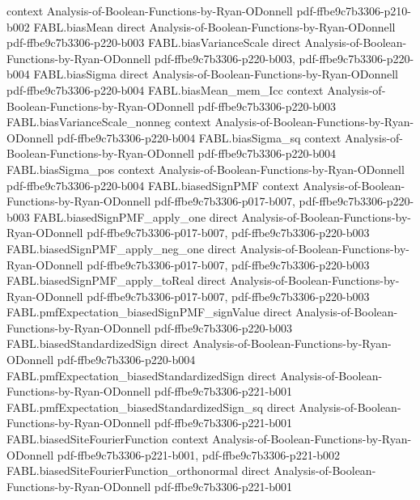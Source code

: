 \begin{theorem}
  {context}
  {Analysis-of-Boolean-Functions-by-Ryan-ODonnell}
  {pdf-ffbe9c7b3306-p210-b002}
\proofstep
  {FABL.biasMean}
  {direct}
  {Analysis-of-Boolean-Functions-by-Ryan-ODonnell}
  {pdf-ffbe9c7b3306-p220-b003}
\proofstep
  {FABL.biasVarianceScale}
  {direct}
  {Analysis-of-Boolean-Functions-by-Ryan-ODonnell}
  {pdf-ffbe9c7b3306-p220-b003,
    pdf-ffbe9c7b3306-p220-b004}
\proofstep
  {FABL.biasSigma}
  {direct}
  {Analysis-of-Boolean-Functions-by-Ryan-ODonnell}
  {pdf-ffbe9c7b3306-p220-b004}
\proofstep
  {FABL.biasMean_mem_Icc}
  {context}
  {Analysis-of-Boolean-Functions-by-Ryan-ODonnell}
  {pdf-ffbe9c7b3306-p220-b003}
\proofstep
  {FABL.biasVarianceScale_nonneg}
  {context}
  {Analysis-of-Boolean-Functions-by-Ryan-ODonnell}
  {pdf-ffbe9c7b3306-p220-b004}
\proofstep
  {FABL.biasSigma_sq}
  {context}
  {Analysis-of-Boolean-Functions-by-Ryan-ODonnell}
  {pdf-ffbe9c7b3306-p220-b004}
\proofstep
  {FABL.biasSigma_pos}
  {context}
  {Analysis-of-Boolean-Functions-by-Ryan-ODonnell}
  {pdf-ffbe9c7b3306-p220-b004}
\proofstep
  {FABL.biasedSignPMF}
  {context}
  {Analysis-of-Boolean-Functions-by-Ryan-ODonnell}
  {pdf-ffbe9c7b3306-p017-b007,
    pdf-ffbe9c7b3306-p220-b003}
\proofstep
  {FABL.biasedSignPMF_apply_one}
  {direct}
  {Analysis-of-Boolean-Functions-by-Ryan-ODonnell}
  {pdf-ffbe9c7b3306-p017-b007,
    pdf-ffbe9c7b3306-p220-b003}
\proofstep
  {FABL.biasedSignPMF_apply_neg_one}
  {direct}
  {Analysis-of-Boolean-Functions-by-Ryan-ODonnell}
  {pdf-ffbe9c7b3306-p017-b007,
    pdf-ffbe9c7b3306-p220-b003}
\proofstep
  {FABL.biasedSignPMF_apply_toReal}
  {direct}
  {Analysis-of-Boolean-Functions-by-Ryan-ODonnell}
  {pdf-ffbe9c7b3306-p017-b007,
    pdf-ffbe9c7b3306-p220-b003}
\proofstep
  {FABL.pmfExpectation_biasedSignPMF_signValue}
  {direct}
  {Analysis-of-Boolean-Functions-by-Ryan-ODonnell}
  {pdf-ffbe9c7b3306-p220-b003}
\proofstep
  {FABL.biasedStandardizedSign}
  {direct}
  {Analysis-of-Boolean-Functions-by-Ryan-ODonnell}
  {pdf-ffbe9c7b3306-p220-b004}
\proofstep
  {FABL.pmfExpectation_biasedStandardizedSign}
  {direct}
  {Analysis-of-Boolean-Functions-by-Ryan-ODonnell}
  {pdf-ffbe9c7b3306-p221-b001}
\proofstep
  {FABL.pmfExpectation_biasedStandardizedSign_sq}
  {direct}
  {Analysis-of-Boolean-Functions-by-Ryan-ODonnell}
  {pdf-ffbe9c7b3306-p221-b001}
\proofstep
  {FABL.biasedSiteFourierFunction}
  {context}
  {Analysis-of-Boolean-Functions-by-Ryan-ODonnell}
  {pdf-ffbe9c7b3306-p221-b001,
    pdf-ffbe9c7b3306-p221-b002}
\proofstep
  {FABL.biasedSiteFourierFunction_orthonormal}
  {direct}
  {Analysis-of-Boolean-Functions-by-Ryan-ODonnell}
  {pdf-ffbe9c7b3306-p221-b001}

\end{theorem}
